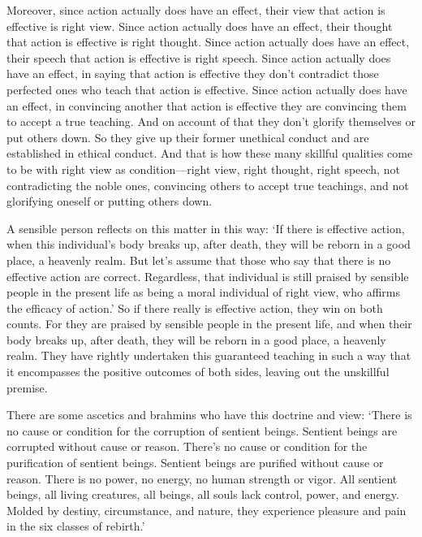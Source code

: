 \documentclass[12pt,openany]{book}%
\begin{document}
Moreover, since action actually does have an effect, their view that action is effective is right view. Since action actually does have an effect, their thought that action is effective is right thought. Since action actually does have an effect, their speech that action is effective is right speech. Since action actually does have an effect, in saying that action is effective they don’t contradict those perfected ones who teach that action is effective. Since action actually does have an effect, in convincing another that action is effective they are convincing them to accept a true teaching. And on account of that they don’t glorify themselves or put others down. So they give up their former unethical conduct and are established in ethical conduct. And that is how these many skillful qualities come to be with right view as condition—right view, right thought, right speech, not contradicting the noble ones, convincing others to accept true teachings, and not glorifying oneself or putting others down. 

A sensible person reflects on this matter in this way: ‘If there is effective action, when this individual’s body breaks up, after death, they will be reborn in a good place, a heavenly realm. But let’s assume that those who say that there is no effective action are correct. Regardless, that individual is still praised by sensible people in the present life as being a moral individual of right view, who affirms the efficacy of action.’ So if there really is effective action, they win on both counts. For they are praised by sensible people in the present life, and when their body breaks up, after death, they will be reborn in a good place, a heavenly realm. They have rightly undertaken this guaranteed teaching in such a way that it encompasses the positive outcomes of both sides, leaving out the unskillful premise. 

There are some ascetics and brahmins who have this doctrine and view: ‘There is no cause or condition for the corruption of sentient beings. Sentient beings are corrupted without cause or reason. There’s no cause or condition for the purification of sentient beings. Sentient beings are purified without cause or reason. There is no power, no energy, no human strength or vigor. All sentient beings, all living creatures, all beings, all souls lack control, power, and energy. Molded by destiny, circumstance, and nature, they experience pleasure and pain in the six classes of rebirth.’ 
\end{document}
